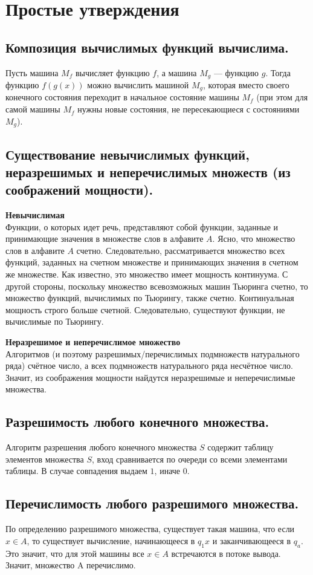 \section{Простые утверждения}

\subsection{Композиция вычислимых функций вычислима.}
Пусть машина $M_f$ вычисляет функцию $f$, а машина $M_g$ — функцию $g$. Тогда функцию $f(g(x))$ можно вычислить машиной $M_g$, которая вместо своего конечного состояния переходит в начальное состояние машины $M_f$ (при этом для самой машины $M_f$ нужны новые состояния, не пересекающиеся с состояниями $M_g$).

\subsection{Существование невычислимых функций, неразрешимых и неперечислимых множеств (из соображений мощности).}
\textbf{Невычислимая}\\
Функции, о которых идет речь, представляют собой функции, заданные и принимающие значения в множестве слов в алфавите $A$. Ясно, что множество слов в алфавите $A$ счетно. Следовательно, рассматривается множество всех функций, заданных на счетном множестве и принимающих значения в счетном же множестве. Как известно, это множество имеет мощность континуума. С другой стороны, поскольку множество всевозможных машин Тьюринга счетно, то множество функций, вычислимых по Тьюрингу, также счетно. Континуальная мощность строго больше счетной. Следовательно, существуют функции, не вычислимые по Тьюрингу.

\textbf{Неразрешимое и неперечислимое множество}\\
Алгоритмов (и поэтому разрешимых/перечислимых подмножеств натурального ряда) счётное число, а всех подмножеств натурального ряда несчётное число. Значит, из соображения мощности найдутся неразрешимые и неперечислимые множества.

\subsection{Разрешимость любого конечного множества.}
Алгоритм разрешения любого конечного множества $S$ содержит таблицу элементов множества $S$, вход сравнивается по очереди со всеми элементами таблицы. В случае совпадения выдаем $1$, иначе $0$.

\subsection{Перечислимость любого разрешимого множества.}
По определению разрешимого множества, существует такая машина, что если $x \in A$, то существует вычисление, начинающееся в $q_1x$ и заканчивающееся в $q_a$. Это значит, что для этой машины все $x \in A$ встречаются в потоке вывода. Значит, множество A перечислимо.

